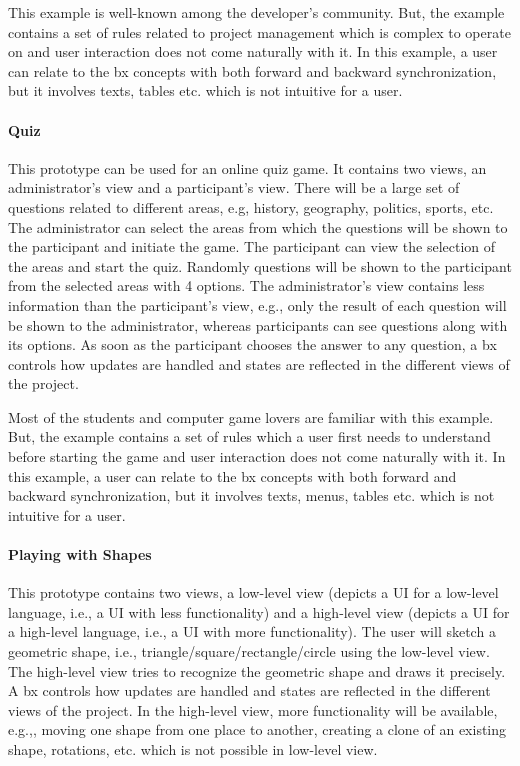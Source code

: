 This example is well-known among the developer's community. But, the example contains a set of rules related to project management which is complex to operate on and user interaction does not come naturally with it. In this example, a user can relate to the bx concepts with both forward and backward synchronization, but it involves texts, tables etc. which is not intuitive for a user.

\paragraph{Quiz} This prototype can be used for an online quiz game. It contains two views, an administrator's view and a participant's view.
There will be a large set of questions related to different areas, e.g, history, geography, politics, sports, etc. The administrator can select the areas from which the questions will be shown to the participant and initiate the game. The participant can view the selection of the areas and start the quiz. Randomly questions will be shown to the participant from the selected areas with 4 options. The administrator's view contains less information than the participant's view, e.g., only the result of each question will be shown to the administrator, whereas participants can see questions along with its options. As soon as the participant chooses the answer to any question, a bx controls how updates are handled and states are reflected in the different views of the project.

Most of the students and computer game lovers are familiar with this example. But, the example contains a set of rules which a user first needs to understand before starting the game and user interaction does not come naturally with it. In this example, a user can relate to the bx concepts with both forward and backward synchronization, but it involves texts, menus, tables etc. which is not intuitive for a user.

\paragraph{Playing with Shapes} This prototype contains two views, a low-level view (depicts a \ac{UI} for a low-level language, i.e., a UI with less functionality) and a high-level view (depicts a UI for a high-level language, i.e., a UI with more functionality). The user will sketch a geometric shape, i.e., triangle/square/rectangle/circle using the low-level view. The high-level view tries to recognize the geometric shape and draws it precisely. A bx controls how updates are handled and states are reflected in the different views of the project. In the high-level view, more functionality will be available, e.g.,, moving one shape from one place to another, creating a clone of an existing shape, rotations, etc. which is not possible in low-level view.

